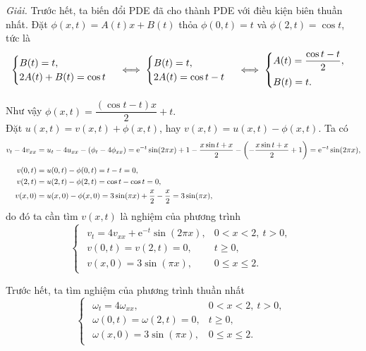 \documentclass[10pt, a4paper]{article}
\begin{document}
	\textit{Giải.} Trước hết, ta biến đổi PDE đã cho thành PDE với điều kiện biên thuần nhất. Đặt $\phi(x,t)=A(t)x+B(t)$ thỏa $\phi(0,t)=t$ và $\phi(2,t)=\cos t$, tức là $$\begin{cases}
		B(t)=t,\\
		2A(t)+B(t)=\cos t
	\end{cases}\iff\begin{cases}
		B(t)=t,\\
		2A(t)=\cos t-t
	\end{cases}\iff\begin{cases}
		A(t)=\dfrac{\cos t-t}{2},\\
		\noalign{\vskip5pt}
		B(t)=t.
	\end{cases}$$
	
	Như vậy $\phi(x,t)=\dfrac{(\cos t-t)x}{2}+t.$\\
	
	Đặt $u(x,t)=v(x,t)+\phi(x,t)$, hay $v(x,t)=u(x,t)-\phi(x,t)$. Ta có \begin{align*}
		v_{t}-4v_{xx}&=u_{t}-4u_{xx}-\left(\phi_{t}-4\phi_{xx}\right)=\mathrm e^{-t}\sin(2\pi x)+1-\dfrac{x\sin t+x}{2}-\left(-\frac{x\sin t+x}{2}+1\right)=\mathrm e^{-t}\sin(2\pi x),\\
		\noalign{\vskip5pt}
		v(0,t)&=u(0,t)-\phi(0,t)=t-t=0,\\
		v(2,t)&=u(2,t)-\phi(2,t)=\cos t-\cos t=0,\\
		v(x,0)&=u(x,0)-\phi(x,0)=3\sin(\pi x)+\dfrac x2-\dfrac x2=3\sin(\pi x),
	\end{align*}
	do đó ta cần tìm $v(x,t)$ là nghiệm của phương trình $$\begin{cases}
		\begin{array}{ll}
			v_t=4v_{xx}+\mathrm e^{-t}\sin(2\pi x), & 0<x<2,~t>0,\\
			v(0,t)=v(2,t)=0, & t\ge0,\\
			v(x,0)=3\sin(\pi x), & 0\le x\le 2.
		\end{array}
	\end{cases}$$
	
	Trước hết, ta tìm nghiệm của phương trình thuần nhất $$\begin{cases}
		\begin{array}{ll}
			\omega_t=4\omega_{xx}, & 0<x<2,~t>0,\\
			\omega(0,t)=\omega(2,t)=0, & t\ge0,\\
			\omega(x,0)=3\sin(\pi x), & 0\le x\le 2.
		\end{array}
	\end{cases}$$
	
\end{document}
